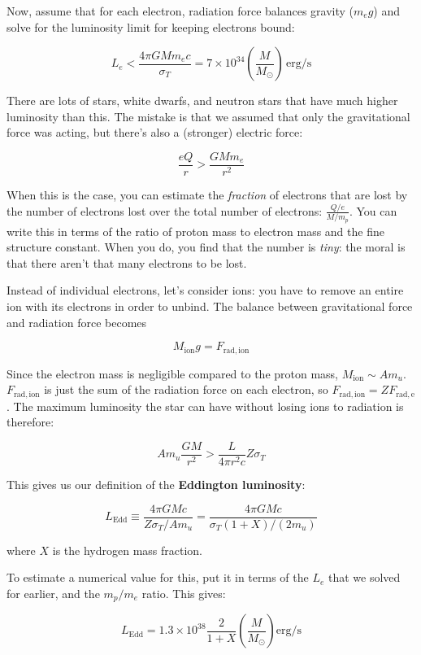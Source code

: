 \documentclass[12pt, letterpaper, preprint]{aastex}
\newcommand{\ledd}{L_{\mathrm{Edd}}}
\begin{document}
\begin{enumerate}
Now, assume that for each electron, radiation force balances gravity ($m_e g$) and solve for the luminosity limit for keeping electrons bound:

$$ L_e < \frac{4 \pi G M m_e c}{\sigma_T} = 7 \times 10^{34} \left( \frac{M}{M_\odot} \right) \, \mathrm{erg/s}$$

There are lots of stars, white dwarfs, and neutron stars that have much higher luminosity than this. The mistake is that we assumed that only the gravitational force was acting, but there's also a (stronger) electric force:

$$ \frac{e Q}{r} > \frac{G M m_e} {r^2} $$

When this is the case, you can estimate the \emph{fraction} of electrons that are lost by the number of electrons lost over the total number of electrons: $\frac{Q/e}{M/m_p}$. You can write this in terms of the ratio of proton mass to electron mass and the fine structure constant. When you do, you find that the number is \emph{tiny}: the moral is that there aren't that many electrons to be lost. 

Instead of individual electrons, let's consider ions: you have to remove an entire ion with its electrons in order to unbind. The balance between gravitational force and radiation force becomes

$$ M_{\mathrm{ion}} g = F_{\mathrm{rad, ion}} $$

Since the electron mass is negligible compared to the proton mass, $M_{\mathrm{ion}} \sim A m_u$. $F_{\mathrm{rad, ion}}$ is just the sum of the radiation force on each electron, so $F_{\mathrm{rad, ion}} = Z F_{\mathrm{rad, e}}$. The maximum luminosity the star can have without losing ions to radiation is therefore: 

$$ A m_u \frac{GM}{r^2} > \frac{L}{4 \pi r^2 c} Z \sigma_T $$

This gives us our definition of the \textbf{Eddington luminosity}:

\begin{equation}
\ledd \equiv \frac{4 \pi G M c}{Z \sigma_T / A m_u} = \frac{4 \pi G M c}{\sigma_T (1 + X) / (2 m_u)}
\end{equation}

where $X$ is the hydrogen mass fraction. 

To estimate a numerical value for this, put it in terms of the $L_e$ that we solved for earlier, and the $m_p/m_e$ ratio. This gives:

$$ \ledd = 1.3 \times 10^{38} \frac{2}{1+X} \left( \frac{M}{M_\odot} \right) \mathrm{erg/s} $$


\end{enumerate}
\end{document}
